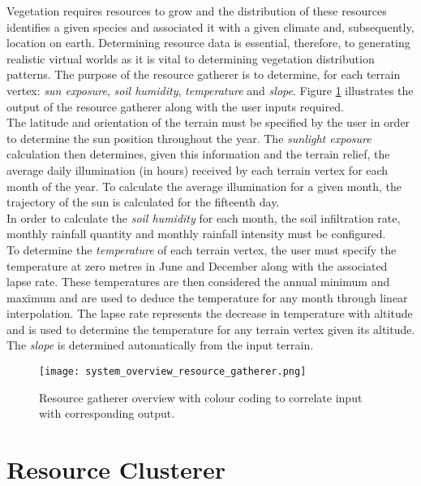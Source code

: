 Vegetation requires resources to grow and the distribution of these resources identifies a given species and associated it with a given climate and, subsequently, location on earth. Determining resource data is essential, therefore, to generating realistic virtual worlds as it is vital to determining vegetation distribution patterns. The purpose of the resource gatherer is to determine, for each terrain vertex: \textit{sun exposure}, \textit{soil humidity}, \textit{temperature} and \textit{slope}. Figure \ref{fig:system_overview_resource_gatherer} illustrates the output of the resource gatherer along with the user inputs required.\\
The latitude and orientation of the terrain must be specified by the user in order to determine the sun position throughout the year. The \textit{sunlight exposure} calculation then determines, given this information and the terrain relief, the average daily illumination (in hours) received by each terrain vertex for each month of the year. To calculate the average illumination for a given month, the trajectory of the sun is calculated for the fifteenth day. \\
In order to calculate the \textit{soil humidity} for each month, the soil infiltration rate, monthly rainfall quantity and monthly rainfall intensity must be configured.\\
To determine the \textit{temperature} of each terrain vertex, the user must specify the temperature at zero metres in June and December along with the associated lapse rate. These temperatures are then considered the annual minimum and maximum and are used to deduce the temperature for any month through linear interpolation. The lapse rate represents the decrease in temperature with altitude and is used to determine the temperature for any terrain vertex given its altitude. \\
The \textit{slope} is determined automatically from the input terrain.\\

\begin{figure}
\center
	\texttt{[image: system\_overview\_resource\_gatherer.png]}
	\caption{ Resource gatherer overview with colour coding to correlate input with corresponding output.}	
	\label{fig:system_overview_resource_gatherer}
\end{figure}

\section{Resource Clusterer}

